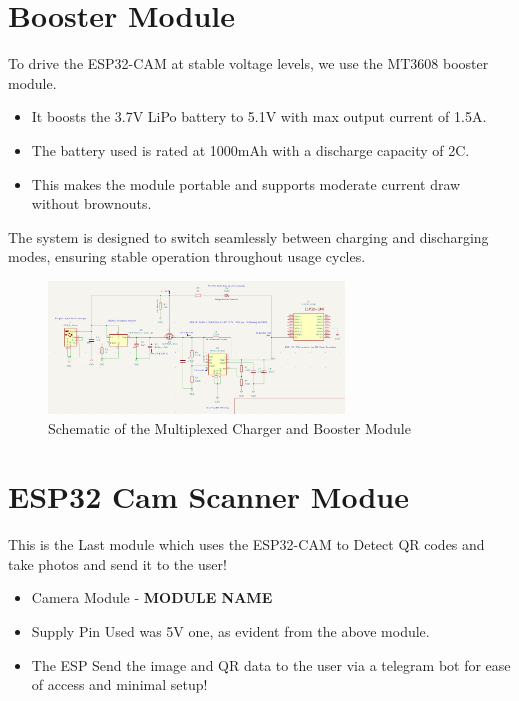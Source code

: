\section{Booster Module}

To drive the ESP32-CAM at stable voltage levels, we use the MT3608 booster module.

\begin{itemize}
    \item It boosts the 3.7V LiPo battery to 5.1V with max output current of 1.5A.
    \item The battery used is rated at 1000mAh with a discharge capacity of 2C.
    \item This makes the module portable and supports moderate current draw without brownouts.
\end{itemize}

The system is designed to switch seamlessly between charging and discharging modes, ensuring stable operation throughout usage cycles.

\begin{figure}[H]
    \centering
    \includegraphics[width=0.7\textwidth]{MultiplexCHD.png}
    \caption{Schematic of the Multiplexed Charger and Booster Module}
    \label{fig:adapter_module}
\end{figure}

\section{ESP32 Cam Scanner Modue}
This is the Last module which uses the ESP32-CAM to Detect QR codes and take photos and send it to the user!

\begin{itemize}
    \item Camera Module - \textbf{MODULE NAME}
    \item Supply Pin Used was 5V one, as evident from the above module.
    \item The ESP Send the image and QR data to the user via a telegram bot for ease of access and minimal setup!
\end{itemize}
